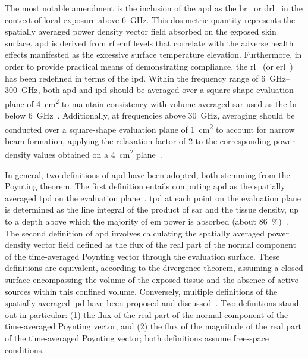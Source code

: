 The most notable amendment is the inclusion of the \gls{apd} as the \gls{br}~\cite{ICNIRP2020Guidelines} or \gls{drl}~\cite{IEEE2019Standard} in the context of local exposure above \SI{6}{\GHz}.
This dosimetric quantity represents the spatially averaged power density vector field absorbed on the exposed skin surface.
\Gls{apd} is derived from \gls{rf} \gls{emf} levels that correlate with the adverse health effects manifested as the excessive surface temperature elevation.
Furthermore, in order to provide practical means of demonstrating compliance, the \gls{rl}~\cite{ICNIRP2020Guidelines} (or \gls{erl}~\cite{IEEE2019Standard}) has been redefined in terms of the \gls{ipd}.
Within the frequency range of \SIrange{6}{300}{\GHz}, both \gls{apd} and \gls{ipd} should be averaged over a square-shape evaluation plane of \SI{4}{\cm\squared} to maintain consistency with volume-averaged \gls{sar} used as the \gls{br} below \SI{6}{\GHz}~\cite{Funahashi2018Averaging,Hashimoto2017averaging}.
Additionally, at frequencies above \SI{30}{\GHz}, averaging should be conducted over a square-shape evaluation plane of \SI{1}{\cm\squared} to account for narrow beam formation, applying the relaxation factor of \num{2} to the corresponding power density values obtained on a \SI{4}{\cm\squared} plane~\cite{Foster2016Thermal}.

In general, two definitions of \gls{apd} have been adopted, both stemming from the Poynting theorem.
The first definition entails computing \gls{apd} as the spatially averaged \gls{tpd} on the evaluation plane~\cite{Hirata2018Review}.
\Gls{tpd} at each point on the evaluation plane is determined as the line integral of the product of \gls{sar} and the tissue density, up to a depth above which the majority of \gls{em} power is absorbed (about \SI{86}{\percent})~\cite{Funahashi2018Area-averaged}.
The second definition of \gls{apd} involves calculating the spatially averaged power density vector field defined as the flux of the real part of the normal component of the time-averaged Poynting vector through the evaluation surface.
These definitions are equivalent, according to the divergence theorem, assuming a closed surface encompassing the volume of the exposed tissue and the absence of active sources within this confined volume.
Conversely, multiple definitions of the spatially averaged \gls{ipd} have been proposed and discussed~\cite{IEEE2021Guide}.
Two definitions stand out in particular: (1) the flux of the real part of the normal component of the time-averaged Poynting vector, and (2) the flux of the magnitude of the real part of the time-averaged Poynting vector; both definitions assume free-space conditions.

